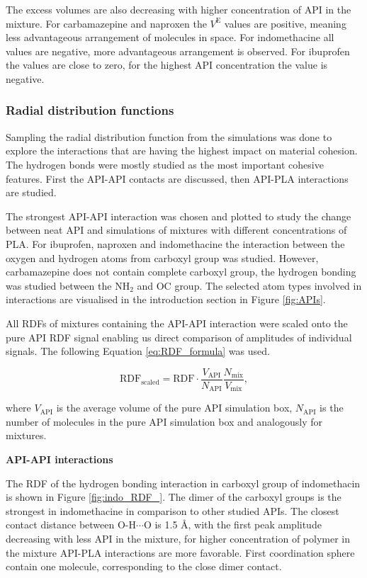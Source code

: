 The excess volumes are also decreasing with higher concentration of API in the mixture. For carbamazepine and naproxen the $V^\text{E}$ values are positive, meaning less advantageous arrangement of molecules in space. For indomethacine all values are negative, more advantageous arrangement is observed. For ibuprofen the values are close to zero, for the highest API concentration the value is negative.

\subsubsection{Radial distribution functions}

Sampling the radial distribution function from the simulations was done to explore the interactions that are having the highest impact on material cohesion. The hydrogen bonds were mostly studied as the most important cohesive features. First the API-API contacts are discussed, then API-PLA interactions are studied.

The strongest API-API interaction was chosen and plotted to study the change between neat API and simulations of mixtures with different concentrations of PLA. For ibuprofen, naproxen and indomethacine the interaction between the oxygen and hydrogen atoms from carboxyl group was studied. However, carbamazepine does not contain complete carboxyl group, the hydrogen bonding was studied between the N$\text{H}_\text{2}$ and OC group. The selected atom types involved in interactions are visualised in the introduction section in Figure \ref{fig:APIs}. 

All RDFs of mixtures containing the API-API interaction were scaled onto the pure API RDF signal enabling us direct comparison of amplitudes of individual signals. The following Equation \ref{eq:RDF_formula} was used.

\begin{equation}\label{eq:RDF_formula}
	\text{RDF}_{\text{scaled}} = \text{RDF} \cdot \frac{V_{\text{API}}}{N_{\text{API}}} \frac{N_{\text{mix}}}{V_{\text{mix}}},
\end{equation}

where $V_{\text{API}}$ is the average volume of the pure API simulation box, $N_{\text{API}}$ is the number of molecules in the pure API simulation box and analogously for mixtures.

\newpage
\textbf{API-API interactions}

The RDF of the hydrogen bonding interaction in carboxyl group of indomethacin is shown in Figure \ref{fig:indo_RDF_}. The dimer of the carboxyl groups is the strongest in indomethacine in comparison to other studied APIs. The closest contact distance between O-H$\cdots$O is 1.5 \AA, with the first peak amplitude decreasing with less API in the mixture, for higher concentration of polymer in the mixture API-PLA interactions are more favorable. First coordination sphere contain one molecule, corresponding to the close dimer contact.

